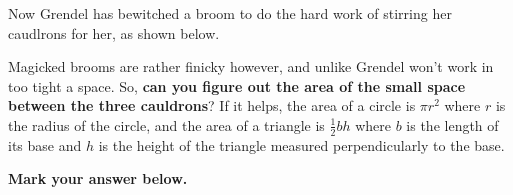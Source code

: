 


Now Grendel has bewitched a broom to do the hard work of stirring her
caudlrons for her, as shown below.

\begin{center}
\end{center}

Magicked brooms are rather finicky however, and unlike Grendel won't work
in too tight a space. So, \textbf{can you figure out the area of the small
space between the three cauldrons}? If it helps, the area of a circle is
\(\pi r^2\) where \(r\) is the radius of the circle, and the area of
a triangle is \(\frac{1}{2}bh\) where \(b\) is the length of its base
and \(h\) is the height of the triangle measured perpendicularly to the base.

\vspace{2em}

\textbf{Mark your answer below.}

